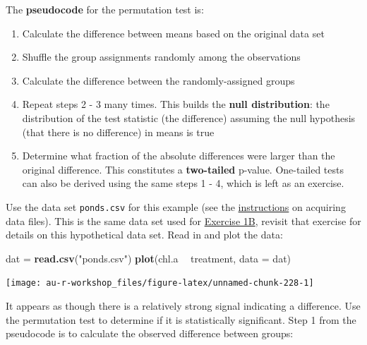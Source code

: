 \documentclass[]{book}
\newenvironment{Shaded}{\begin{snugshade}}{\end{snugshade}}
\newcommand{\KeywordTok}[1]{\textcolor[rgb]{0.13,0.29,0.53}{\textbf{#1}}}
\newcommand{\DataTypeTok}[1]{\textcolor[rgb]{0.13,0.29,0.53}{#1}}
\newcommand{\StringTok}[1]{\textcolor[rgb]{0.31,0.60,0.02}{#1}}
\newcommand{\OperatorTok}[1]{\textcolor[rgb]{0.81,0.36,0.00}{\textbf{#1}}}
\newcommand{\NormalTok}[1]{#1}
\providecommand{\tightlist}{%
  \setlength{\itemsep}{0pt}\setlength{\parskip}{0pt}}
\theoremstyle{definition}
\theoremstyle{definition}
\theoremstyle{definition}
\theoremstyle{remark}
\begin{document}
The \textbf{pseudocode} for the permutation test is:

\begin{enumerate}
\def\labelenumi{\arabic{enumi}.}
\tightlist
\item
  Calculate the difference between means based on the original data set
\item
  Shuffle the group assignments randomly among the observations
\item
  Calculate the difference between the randomly-assigned groups
\item
  Repeat steps 2 - 3 many times. This builds the \textbf{null
  distribution}: the distribution of the test statistic (the difference)
  assuming the null hypothesis (that there is no difference) in means is
  true
\item
  Determine what fraction of the absolute differences were larger than
  the original difference. This constitutes a \textbf{two-tailed}
  p-value. One-tailed tests can also be derived using the same steps 1 -
  4, which is left as an exercise.
\end{enumerate}

Use the data set \texttt{ponds.csv} for this example (see the
\protect\hyperlink{data-sets}{instructions} on acquiring data files).
This is the same data set used for \protect\hyperlink{ex1b}{Exercise
1B}, revisit that exercise for details on this hypothetical data set.
Read in and plot the data:

\begin{Shaded}
\begin{Highlighting}[]
\NormalTok{dat =}\StringTok{ }\KeywordTok{read.csv}\NormalTok{(}\StringTok{"ponds.csv"}\NormalTok{)}
\KeywordTok{plot}\NormalTok{(chl.a }\OperatorTok{~}\StringTok{ }\NormalTok{treatment, }\DataTypeTok{data =}\NormalTok{ dat)}
\end{Highlighting}
\end{Shaded}

\begin{center}\texttt{[image: au-r-workshop\_files/figure-latex/unnamed-chunk-228-1]} \end{center}

It appears as though there is a relatively strong signal indicating a
difference. Use the permutation test to determine if it is statistically
significant. Step 1 from the pseudocode is to calculate the observed
difference between groups:

\begin{Shaded}
\end{Shaded}
\end{document}
